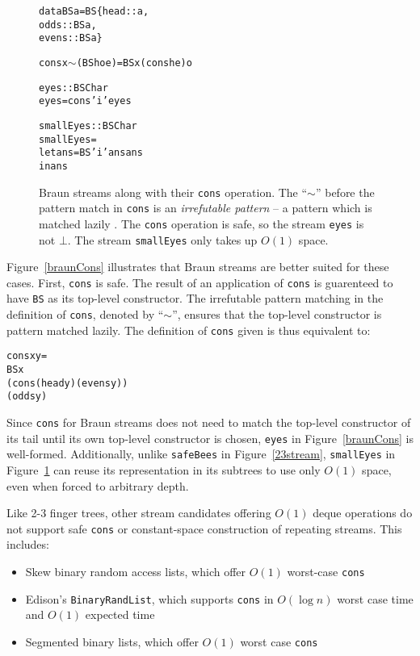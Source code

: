 \documentclass{llncs}
\begin{document}
\begin{figure}
\begin{alltt}
data BS a = BS \{head::a, 
                odds::BS a, 
                evens::BS a\}

cons x \(\sim\)(BS h o e) = BS x (cons h e) o

eyes :: BS Char
eyes = cons 'i' eyes

smallEyes :: BS Char
smallEyes = 
  let ans = BS 'i' ans ans 
  in ans
\end{alltt}
\caption{
Braun streams along with their {\tt cons} operation.
The ``$\sim$'' before the pattern match in {\tt cons} is an {\em irrefutable pattern} -- a pattern which is matched lazily \cite{haskellReport}.
The {\tt cons} operation is safe, so the stream {\tt eyes} is not $\bot$.
The stream {\tt smallEyes} only takes up $O(1)$ space.
}
\label{braunDef}
\label{braunCons}
\label{braunShare}
\end{figure}

Figure~\ref{braunCons} illustrates that Braun streams are better suited for these cases.
First, {\tt cons} is safe.
The result of an application of {\tt cons} is guarenteed to have {\tt BS} as its top-level constructor.
The irrefutable pattern matching in the definition of {\tt cons}, denoted by ``$\sim$'', ensures that the top-level constructor is pattern matched lazily.
The definition of {\tt cons} given is thus equivalent to:

\begin{alltt}
cons x y =
  BS x
     (cons (head y) (evens y))
     (odds y)
\end{alltt}

Since {\tt cons} for Braun streams does not need to match the top-level constructor of its tail until its own top-level constructor is chosen, {\tt eyes} in Figure~\ref{braunCons} is well-formed.
Additionally, unlike {\tt safeBees} in Figure~\ref{23stream}, {\tt smallEyes} in Figure~\ref{braunShare} can reuse its representation in its subtrees to use only $O(1)$ space, even when forced to arbitrary depth.

Like 2-3 finger trees, other stream candidates offering $O(1)$ deque operations do not support safe {\tt cons} or constant-space construction of repeating streams. This includes:

\begin{itemize}
\item Skew binary random access lists, which offer $O(1)$ worst-case {\tt cons} \cite{okasakiSkewLists}
\item Edison's \verb|BinaryRandList|, which supports {\tt cons} in $O(\log n)$ worst case time and $O(1)$ expected time \cite{edison,holtersThesis}
\item Segmented binary lists, which offer $O(1)$ worst case {\tt cons} \cite{okasakiThesis}
\end{itemize}
\end{document}
